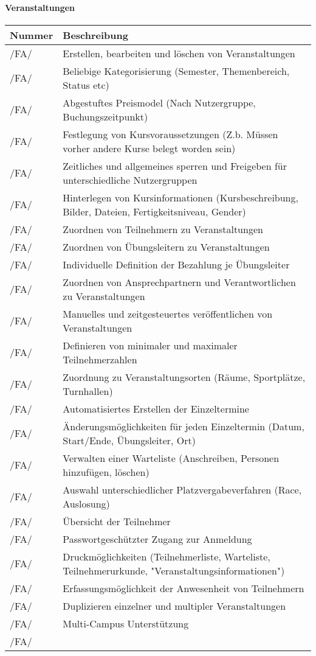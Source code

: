 \documentclass[a4paper,12pt]{article}
\newcommand\addrow[2]{#1 &#2\\ }
\newcommand\addheading[2]{#1 &#2\\ \hline}
\newcommand\tabularhead{\begin{tabular}{lp{13cm}}
\hline
}
\newenvironment{usecase}{\tabularhead}
{\hline\end{tabular}}
\begin{document}
\paragraph{\textbf{Veranstaltungen}\\}
\begin{usecase}
  \addheading{Nummer}{Beschreibung} 
  \addrow{/FA/}{Erstellen, bearbeiten und löschen von Veranstaltungen}
  \addrow{/FA/}{Beliebige Kategorisierung (Semester, Themenbereich, Status etc)}
  \addrow{/FA/}{Abgestuftes Preismodel (Nach Nutzergruppe, Buchungszeitpunkt)}
  \addrow{/FA/}{Festlegung von Kursvoraussetzungen (Z.b. Müssen vorher andere Kurse belegt worden sein)}
  \addrow{/FA/}{Zeitliches und allgemeines sperren und Freigeben für unterschiedliche Nutzergruppen}
  \addrow{/FA/}{Hinterlegen von Kursinformationen (Kursbeschreibung, Bilder, Dateien, Fertigkeitsniveau, Gender)}
  \addrow{/FA/}{Zuordnen von Teilnehmern zu Veranstaltungen}
  \addrow{/FA/}{Zuordnen von Übungsleitern zu Veranstaltungen}
  \addrow{/FA/}{Individuelle Definition der Bezahlung je Übungsleiter}
  \addrow{/FA/}{Zuordnen von Ansprechpartnern und Verantwortlichen zu Veranstaltungen}
  \addrow{/FA/}{Manuelles und zeitgesteuertes veröffentlichen von Veranstaltungen}
  \addrow{/FA/}{Definieren von minimaler und maximaler Teilnehmerzahlen}
  \addrow{/FA/}{Zuordnung zu Veranstaltungsorten (Räume, Sportplätze, Turnhallen)}
  \addrow{/FA/}{Automatisiertes Erstellen der Einzeltermine}
  \addrow{/FA/}{Änderungsmöglichkeiten für jeden Einzeltermin (Datum, Start/Ende, Übungsleiter, Ort)}
  \addrow{/FA/}{Verwalten einer Warteliste (Anschreiben, Personen hinzufügen, löschen)}
  \addrow{/FA/}{Auswahl unterschiedlicher Platzvergabeverfahren (Race, Auslosung)}
  \addrow{/FA/}{Übersicht der Teilnehmer}
  \addrow{/FA/}{Passwortgeschützter Zugang zur Anmeldung}
  \addrow{/FA/}{Druckmöglichkeiten (Teilnehmerliste, Warteliste, Teilnehmerurkunde, "Veranstaltungsinformationen")}
  \addrow{/FA/}{Erfassungsmöglichkeit der Anwesenheit von Teilnehmern}
  \addrow{/FA/}{Duplizieren einzelner und multipler Veranstaltungen}
  \addrow{/FA/}{Multi-Campus Unterstützung}
  \addrow{/FA/}{}
\end{usecase}
\end{document}
